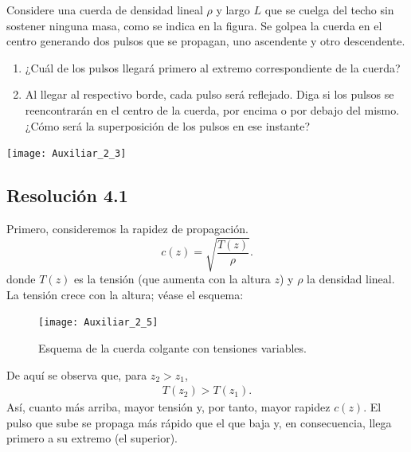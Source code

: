 \documentclass[
  11pt,
  letterpaper,
   addpoints,
  ]{exam}
\begin{document}
\begin{questions}
\noindent
\begin{minipage}[t]{0.65\textwidth}
\question Considere una cuerda de densidad lineal $\rho$ y largo $L$ que se cuelga del techo
sin sostener ninguna masa, como se indica en la figura. Se golpea la cuerda en el
centro generando dos pulsos que se propagan, uno ascendente y otro descendente.
\begin{enumerate}
  \item ¿Cuál de los pulsos llegará primero al extremo correspondiente de la cuerda?
  \item Al llegar al respectivo borde, cada pulso será reflejado. Diga si los pulsos se reencontrarán en el centro de la cuerda, por encima o por debajo del mismo. ¿Cómo será la superposición de los pulsos en ese instante?
\end{enumerate}
\end{minipage}\hfill
\begin{minipage}[t]{0.3\textwidth}
  \centering
  \vspace{-1.0\baselineskip}%
  \texttt{[image: Auxiliar\_2\_3]}
  \captionsetup{type=figure}
  \label{fig:cuerda-colgante}
\end{minipage}
\begin{solution}
\subsection*{Resolución 4.1}
Primero, consideremos la rapidez de propagación.
\begin{equation}
  c(z)=\sqrt{\frac{T(z)}{\rho}}.
\end{equation}
donde $T(z)$ es la tensión (que aumenta con la altura $z$) y $\rho$ la densidad lineal. La tensión crece con la altura; véase el esquema:
\begin{figure}[H]
  \centering
  \texttt{[image: Auxiliar\_2\_5]}
  \caption{Esquema de la cuerda colgante con tensiones variables.}
  \label{fig:esquema-tension}
\end{figure}
De aquí se observa que, para $z_2>z_1$,
\begin{align}
  T(z_{2}) > T(z_{1}).
\end{align}
Así, cuanto más arriba, mayor tensión y, por tanto, mayor rapidez $c(z)$. El pulso que sube se propaga más rápido que el que baja y, en consecuencia, llega primero a su extremo (el superior).


\end{solution}
\end{questions}
\end{document}
